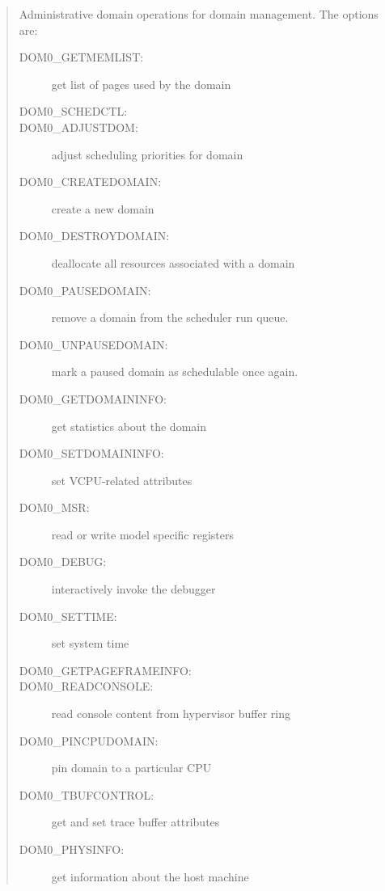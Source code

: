 \documentclass[11pt,twoside,final,openright,a4paper]{report}
\newcommand{\hypercall}[1]{\vspace{2mm}{\sf #1}}
\begin{document}
\begin{quote}
\hypercall{dom0\_op(dom0\_op\_t *op)} 

Administrative domain operations for domain management. The options are:

\begin{description} 
\item [DOM0\_GETMEMLIST:] get list of pages used by the domain

\item [DOM0\_SCHEDCTL:]

\item [DOM0\_ADJUSTDOM:] adjust scheduling priorities for domain

\item [DOM0\_CREATEDOMAIN:] create a new domain

\item [DOM0\_DESTROYDOMAIN:] deallocate all resources associated
with a domain

\item [DOM0\_PAUSEDOMAIN:] remove a domain from the scheduler run 
queue. 

\item [DOM0\_UNPAUSEDOMAIN:] mark a paused domain as schedulable
  once again. 

\item [DOM0\_GETDOMAININFO:] get statistics about the domain

\item [DOM0\_SETDOMAININFO:] set VCPU-related attributes

\item [DOM0\_MSR:] read or write model specific registers

\item [DOM0\_DEBUG:] interactively invoke the debugger

\item [DOM0\_SETTIME:] set system time

\item [DOM0\_GETPAGEFRAMEINFO:] 

\item [DOM0\_READCONSOLE:] read console content from hypervisor buffer ring

\item [DOM0\_PINCPUDOMAIN:] pin domain to a particular CPU

\item [DOM0\_TBUFCONTROL:] get and set trace buffer attributes

\item [DOM0\_PHYSINFO:] get information about the host machine


\end{description}
\end{quote}
\end{document}
